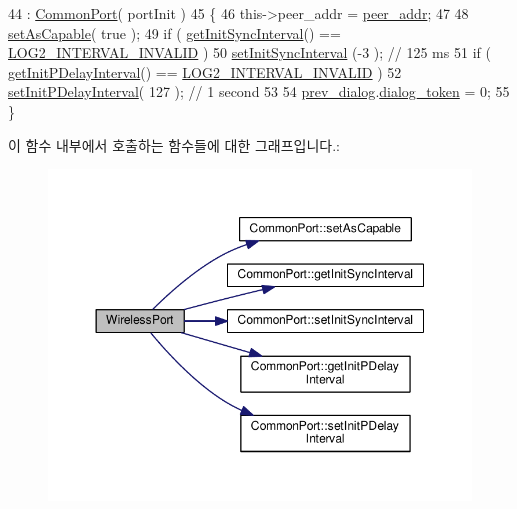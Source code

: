 \begin{DoxyCode}
44 : \hyperlink{class_common_port_ad9ae8813f6ab0d8c962ca271653b7da5}{CommonPort}( portInit )
45 \{
46     this->peer\_addr = \hyperlink{class_wireless_port_a2e3c335f16cf24c8ca44069a6c6149e0}{peer\_addr};
47 
48     \hyperlink{class_common_port_a6f66d6a79abf9ead80338a891ebadcf3}{setAsCapable}( \textcolor{keyword}{true} );
49     \textcolor{keywordflow}{if} ( \hyperlink{class_common_port_af10585c4e9853d5a958933d5c5357445}{getInitSyncInterval}() == \hyperlink{common__port_8hpp_abe9784f98a314213bf6ca39d08775257}{LOG2\_INTERVAL\_INVALID} )
50         \hyperlink{class_common_port_a1af3691c565a65c9212b3f0adf1f76ac}{setInitSyncInterval} (-3 );       \textcolor{comment}{// 125 ms}
51     \textcolor{keywordflow}{if} ( \hyperlink{class_common_port_ad2164f9dd75bd80b8e8dd7456f6c5dc3}{getInitPDelayInterval}() == \hyperlink{common__port_8hpp_abe9784f98a314213bf6ca39d08775257}{LOG2\_INTERVAL\_INVALID} )
52         \hyperlink{class_common_port_ae85afbc79e2236958fd975d9bd55d61e}{setInitPDelayInterval}( 127 );  \textcolor{comment}{// 1 second}
53 
54     \hyperlink{class_wireless_port_a837ae08924bbe166dc511f00c6f64104}{prev\_dialog}.\hyperlink{class_wireless_dialog_af4c116e249b109ded342c6ae740980ef}{dialog\_token} = 0;
55 \}
\end{DoxyCode}


이 함수 내부에서 호출하는 함수들에 대한 그래프입니다.\+:
\nopagebreak
\begin{figure}[H]
\begin{center}
\leavevmode
\includegraphics[width=350pt]{class_wireless_port_a334a571629e980a524075a227b2d609b_cgraph}
\end{center}
\end{figure}


